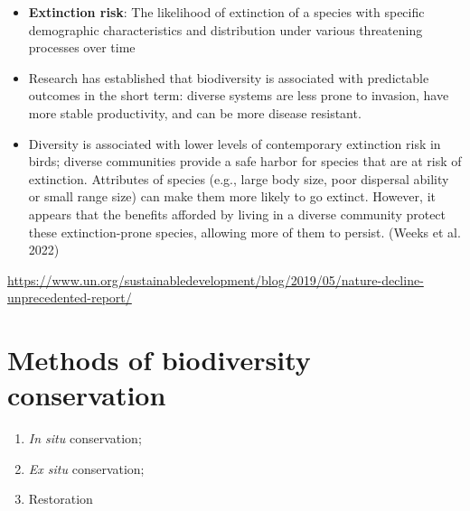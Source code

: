 \documentclass[
  ignorenonframetext,
  aspectratio=169]{beamer}
\providecommand{\tightlist}{%
  \setlength{\itemsep}{0pt}\setlength{\parskip}{0pt}}
\begin{document}
\begin{frame}{}
\protect\hypertarget{section}{}
\begin{itemize}
\tightlist
\item
  \textbf{Extinction risk}: The likelihood of extinction of a species
  with specific demographic characteristics and distribution under
  various threatening processes over time
\item
  Research has established that biodiversity is associated with
  predictable outcomes in the short term: diverse systems are less prone
  to invasion, have more stable productivity, and can be more disease
  resistant.
\item
  Diversity is associated with lower levels of contemporary extinction
  risk in birds; diverse communities provide a safe harbor for species
  that are at risk of extinction. Attributes of species (e.g., large
  body size, poor dispersal ability or small range size) can make them
  more likely to go extinct. However, it appears that the benefits
  afforded by living in a diverse community protect these
  extinction-prone species, allowing more of them to persist. (Weeks et
  al. 2022)
\end{itemize}
\end{frame}

\begin{frame}{}
\protect\hypertarget{section-1}{}
\url{https://www.un.org/sustainabledevelopment/blog/2019/05/nature-decline-unprecedented-report/}
\end{frame}

\hypertarget{methods-of-biodiversity-conservation}{%
\section{Methods of biodiversity
conservation}\label{methods-of-biodiversity-conservation}}

\begin{frame}{}
\protect\hypertarget{section-2}{}
\begin{enumerate}
\tightlist
\item
  \emph{In situ} conservation;
\item
  \emph{Ex situ} conservation;
\item
  Restoration
\end{enumerate}
\end{frame}
\end{document}
